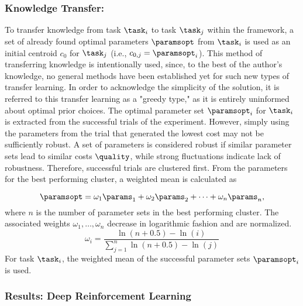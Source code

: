 \subsubsection{Knowledge Transfer: \skillmodelabbr{}}

To transfer knowledge from task $\task_i$ to task $\task_j$ within the \skillmodelabbr{} framework, a set of already found optimal parameters $\paramsopt$ from $\task_i$ is used as an initial centroid $c_0$ for $\task_j$ (i.e., $c_{0,j}=\paramsopt_i$).
This method of transferring knowledge is intentionally used, since, to the best of the author's knowledge, no general methods have been established yet for such new types of transfer learning.
In order to acknowledge the simplicity of the solution, it is referred to this transfer learning as a "greedy type," as it is entirely uninformed about optimal prior choices.
The optimal parameter set $\paramsopt_i$ for $\task_i$ is extracted from the successful trials of the experiment.
However, simply using the parameters from the trial that generated the lowest cost may not be sufficiently robust.
A set of parameters is considered robust if similar parameter sets lead to similar costs $\quality$, while strong fluctuations indicate lack of robustness.
Therefore, successful trials are clustered first.
From the parameters for the best performing cluster, a weighted mean is calculated as

\begin{equation}
    \paramsopt=\omega_1\params_1+\omega_2\params_2+\dots+\omega_n\params_n,
\end{equation}
where $n$ is the number of parameter sets in the best performing cluster.
The associated weights $\omega_1,\dots,\omega_n$ decrease in logarithmic fashion and are normalized.
\begin{equation}
    \omega_i=\frac{\ln(n+0.5)-\ln(i)}{\sum_{j=1}^n \ln(n+0.5)-\ln(j)}
\end{equation}
For task $\task_i$, the weighted mean of the successful parameter sets $\paramsopt_i$ is used.




\subsubsection{Results: Deep Reinforcement Learning}\label{sec:results:DeepRL}

